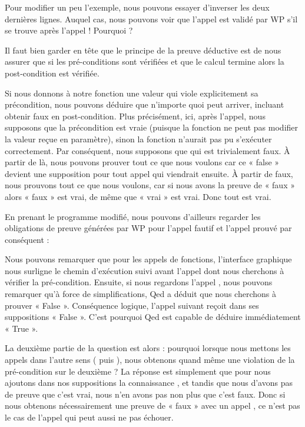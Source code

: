 

Pour modifier un peu l'exemple, nous pouvons essayer d'inverser les deux 
dernières lignes. Auquel cas, nous pouvons voir que l'appel 
est validé par WP s'il se trouve après l'appel  ! 
Pourquoi ?



Il faut bien garder en tête que le principe de la preuve déductive est de nous
assurer que si les pré-conditions sont vérifiées et que le calcul termine alors
la post-condition est vérifiée.


Si nous donnons à notre fonction une valeur qui viole explicitement sa
précondition, nous pouvons déduire que n'importe quoi peut arriver, incluant
obtenir faux en post-condition. Plus précisément, ici, après l'appel, nous
supposons que la précondition est vraie (puisque la fonction ne peut pas
modifier la valeur reçue en paramètre), sinon la fonction n'aurait pas pu
s'exécuter correctement. Par conséquent, nous supposons que
 qui est trivialement faux. À partir de là,
nous pouvons  prouver tout ce que nous voulons car ce « false » devient une supposition pour
tout appel qui viendrait ensuite. À partir de faux, nous prouvons tout ce que 
nous voulons, car si nous avons la preuve de « faux » alors « faux » est vrai, de 
même que « vrai » est vrai. Donc tout est vrai.



En prenant le programme modifié, nous pouvons d'ailleurs regarder les obligations
de preuve générées par WP pour l'appel fautif et l'appel prouvé par conséquent :







Nous pouvons remarquer que pour les appels de fonctions, l'interface graphique
nous surligne le chemin d'exécution suivi avant l'appel dont nous cherchons à 
vérifier la pré-condition. Ensuite, si nous regardons l'appel ,
nous pouvons remarquer qu'à force de simplifications, Qed a déduit que nous 
cherchons à prouver « False ». Conséquence logique, l'appel suivant  
reçoit dans ses suppositions « False ». C'est pourquoi Qed est capable de déduire
immédiatement « True ».



La deuxième partie de la question est alors : pourquoi lorsque nous mettons les 
appels dans l'autre sens ( puis ), nous obtenons 
quand même une violation de la pré-condition sur le deuxième ? La réponse est 
simplement que pour  nous ajoutons dans nos suppositions la
connaissance , et tandis que nous d'avons pas de preuve
que c'est vrai, nous n'en avons pas non plus que c'est faux. Donc si nous obtenons 
nécessairement une preuve de « faux » avec un appel , ce n'est
pas le cas de l'appel  qui peut aussi ne pas échouer.



